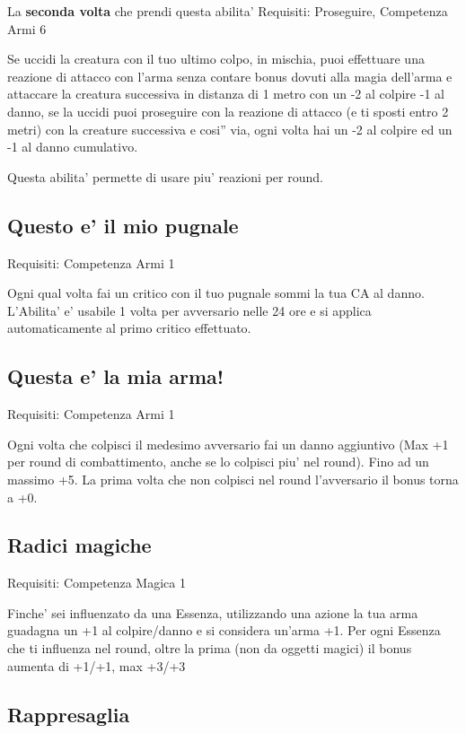 \documentclass[a4paper,11pt,twoside,openany]{dndbook}
\begin{document}
La \textbf{seconda volta} che prendi questa abilita' Requisiti: Proseguire, Competenza Armi 6

Se uccidi la creatura con il tuo ultimo colpo, in mischia, puoi effettuare una reazione di attacco con l'arma senza contare bonus dovuti alla magia dell'arma e attaccare la creatura successiva in distanza di 1 metro con un -2 al colpire -1 al danno, se la uccidi puoi proseguire con la reazione di attacco (e ti sposti entro 2 metri) con la creature successiva e cosi'' via, ogni volta hai un -2 al colpire ed un -1 al danno cumulativo.

Questa abilita' permette di usare piu' reazioni per round.

\subsection{Questo e' il mio pugnale}

Requisiti: Competenza Armi 1

Ogni qual volta fai un critico con il tuo pugnale sommi la tua CA al danno. L'Abilita' e' usabile 1 volta per avversario nelle 24 ore e si applica automaticamente al primo critico effettuato.

\subsection{Questa e' la mia arma!}

Requisiti: Competenza Armi 1

Ogni volta che colpisci il medesimo avversario fai un danno aggiuntivo (Max +1 per round di combattimento, anche se lo colpisci piu' nel round). Fino ad un massimo +5. La prima volta che non colpisci nel round l'avversario il bonus torna a +0.

\subsection{Radici magiche}

Requisiti: Competenza Magica 1

Finche' sei influenzato da una Essenza, utilizzando una azione la tua arma guadagna un +1 al colpire/danno e si considera un'arma +1. Per ogni Essenza che ti influenza nel round, oltre la prima (non da oggetti magici) il bonus aumenta di +1/+1, max +3/+3

\subsection{Rappresaglia}
\end{document}
